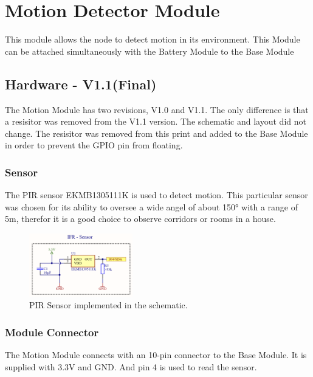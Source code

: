 \section{Motion Detector Module} 

    This module allows the node to detect motion in its environment. This Module can be 
    attached simultaneously with the Battery Module to the Base Module

    \subsection {Hardware - V1.1(Final)}
        The Motion Module has two revisions, V1.0 and V1.1. The only difference is that 
        a resisitor was removed from the V1.1 version. The schematic and layout did not 
        change. The resisitor was removed from this print and added to the Base Module
        in order to prevent the GPIO pin from floating.
    
    
        

        \subsubsection{Sensor}
            The PIR sensor EKMB1305111K is used to detect motion. This particular sensor was chosen
            for its ability to oversee a wide angel of about 150° with a range of 5m, therefor it is
            a good choice to observe corridors or rooms in a house.

            \begin{figure}[H]
                \centering
                \includegraphics[width=0.4\textwidth]{assets/HW/Motion-IRF.png}
                \caption{PIR Sensor implemented in the schematic.}
            \end{figure}

        \subsubsection{Module Connector}
            The Motion Module connects with an 10-pin connector to the Base Module. It is supplied 
            with 3.3V and GND. And pin 4 is used to read the sensor.

